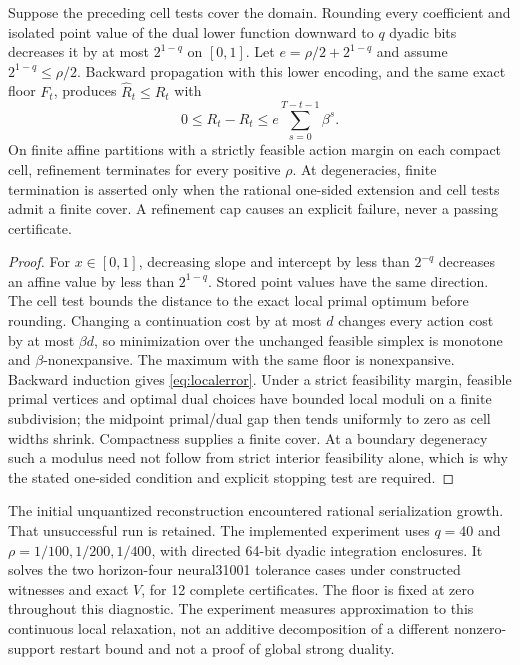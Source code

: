 \begin{theorem}\label{thm:local}
Suppose the preceding cell tests cover the domain. Rounding every coefficient and isolated point value of the dual lower function downward to $q$ dyadic bits decreases it by at most $2^{1-q}$ on $[0,1]$. Let $e=\rho/2+2^{1-q}$ and assume $2^{1-q}\leq\rho/2$. Backward propagation with this lower encoding, and the same exact floor $F_t$, produces $\widehat R_t\leq R_t$ with
\begin{equation}\label{eq:localerror}
 0\leq R_t-\widehat R_t\leq e\sum_{s=0}^{T-t-1}\beta^s.
\end{equation}
On finite affine partitions with a strictly feasible action margin on each compact cell, refinement terminates for every positive $\rho$. At degeneracies, finite termination is asserted only when the rational one-sided extension and cell tests admit a finite cover. A refinement cap causes an explicit failure, never a passing certificate.
\end{theorem}
\begin{proof}
For $x\in[0,1]$, decreasing slope and intercept by less than $2^{-q}$ decreases an affine value by less than $2^{1-q}$. Stored point values have the same direction. The cell test bounds the distance to the exact local primal optimum before rounding. Changing a continuation cost by at most $d$ changes every action cost by at most $\beta d$, so minimization over the unchanged feasible simplex is monotone and $\beta$-nonexpansive. The maximum with the same floor is nonexpansive. Backward induction gives \eqref{eq:localerror}. Under a strict feasibility margin, feasible primal vertices and optimal dual choices have bounded local moduli on a finite subdivision; the midpoint primal/dual gap then tends uniformly to zero as cell widths shrink. Compactness supplies a finite cover. At a boundary degeneracy such a modulus need not follow from strict interior feasibility alone, which is why the stated one-sided condition and explicit stopping test are required.\end{proof}

The initial unquantized reconstruction encountered rational serialization growth. That unsuccessful run is retained. The implemented experiment uses $q=40$ and $\rho=1/100,1/200,1/400$, with directed 64-bit dyadic integration enclosures. It solves the two horizon-four neural31001 tolerance cases under constructed witnesses and exact $V$, for 12 complete certificates. The floor is fixed at zero throughout this diagnostic. The experiment measures approximation to this continuous local relaxation, not an additive decomposition of a different nonzero-support restart bound and not a proof of global strong duality.

